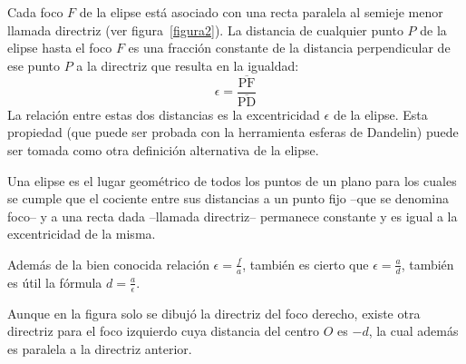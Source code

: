 \documentclass[a2,plainboxedsections]{sciposter}
\begin{document}
\begin{multicols}{3}
Cada foco $F$ de la elipse está asociado con una recta paralela al semieje menor llamada directriz (ver figura~\ref{figura2}). La distancia de cualquier punto $P$ de la elipse hasta el foco $F$ es una fracción constante de la distancia perpendicular de ese punto $P$ a la directriz que resulta en la igualdad:
\[
\epsilon=\frac{\overline{\text{PF}}}{\overline{\text{PD}}}
\]
La relación entre estas dos distancias es la excentricidad $\epsilon$ de la elipse. Esta propiedad (que puede ser probada con la herramienta esferas de Dandelin) puede ser tomada como otra definición alternativa de la elipse.

Una elipse es el lugar geométrico de todos los puntos de un plano para los cuales se cumple que el cociente entre sus distancias a un punto fijo –que se denomina foco– y a una recta dada –llamada directriz– permanece constante y es igual a la excentricidad de la misma.

Además de la bien conocida relación $\epsilon=\frac{f}{a}$, también es cierto que $\epsilon=\frac{a}{d}$, también es útil la fórmula $d=\frac{a}{\epsilon}$.

Aunque en la figura solo se dibujó la directriz del foco derecho, existe otra directriz para el foco izquierdo cuya distancia del centro $O$ es $-d$, la cual además es paralela a la directriz anterior.
\end{multicols}
\end{document}
